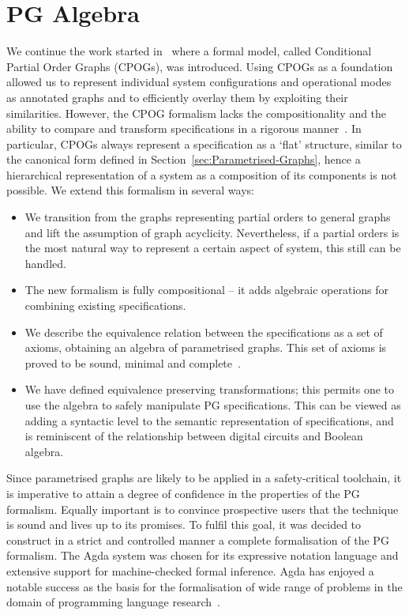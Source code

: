 \section{PG Algebra}

We continue the work started in~\cite{2010_mokhov_ieee}
where a formal model, called Conditional Partial Order Graphs (CPOGs),
was introduced. Using CPOGs as a foundation allowed us to represent individual system configurations
and operational modes as annotated graphs and to efficiently overlay them by exploiting
their similarities. However, the CPOG formalism lacks the compositionality
and the ability to compare and transform specifications in a rigorous
manner~\cite{pg_algebra}. In particular, CPOGs always represent a specification as
a `flat' structure, similar to the canonical form defined in Section~\ref{sec:Parametrised-Graphs},
hence a hierarchical representation of a system as a composition of
its components is not possible. We extend this formalism in several
ways:

\begin{itemize}
\item We transition from the graphs representing partial orders to general graphs and lift the assumption of graph acyclicity.
Nevertheless, if a partial orders is the most natural way to represent
a certain aspect of system, this still can be handled. 
\item The new formalism is fully compositional -- it adds algebraic operations for combining existing specifications.
\item We describe the equivalence relation between the specifications as
a set of axioms, obtaining an algebra of parametrised graphs. This set of axioms is proved
to be sound, minimal and complete~\cite{pg_algebra}.
\item We have defined equivalence preserving transformations; this permits one to use the algebra to safely manipulate PG specifications. 
This can be viewed as adding a syntactic level to the semantic representation
of specifications, and is reminiscent of the relationship between digital
circuits and Boolean algebra.
\end{itemize}

Since parametrised graphs are likely to be applied in a safety-critical toolchain, it is imperative to attain a degree of confidence in the properties of the PG formalism. Equally important is to convince prospective users that the technique is sound and lives up to its promises. To fulfil this goal, it was decided to construct in a strict and controlled manner a complete formalisation of the PG formalism. The Agda system \cite{agda} was chosen for its expressive notation language and extensive support for machine-checked formal inference. Agda has enjoyed a notable success as the basis for the formalisation of wide range of problems in the domain of programming language research~\cite{2xagda_usages}.

